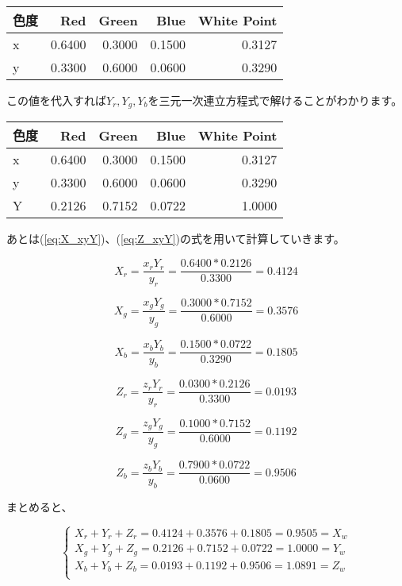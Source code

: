 \documentclass[12pt]{jsarticle}
\begin{document}
\begin{center}
\begin{tabular}{|l|r|r|r|r|} \hline
色度 & Red & Green & Blue & White Point \\ \hline
x & 0.6400 & 0.3000 & 0.1500 & 0.3127 \\ \hline
y & 0.3300 & 0.6000 & 0.0600 & 0.3290 \\ \hline
\end{tabular}
\end{center}

この値を代入すれば$Y_r, Y_g, Y_b$を三元一次連立方程式で解けることがわかります。

\begin{center}
\begin{tabular}{|l|r|r|r|r|} \hline
色度 & Red & Green & Blue & White Point \\ \hline
x & 0.6400 & 0.3000 & 0.1500 & 0.3127 \\ \hline
y & 0.3300 & 0.6000 & 0.0600 & 0.3290 \\ \hline
Y & 0.2126 & 0.7152 & 0.0722 & 1.0000 \\ \hline
\end{tabular}
\end{center}

あとは(\ref{eq:X_xyY})、(\ref{eq:Z_xyY})の式を用いて計算していきます。

\[
X_r = \frac{x_rY_r}{y_r} = \frac{0.6400 * 0.2126}{0.3300} = 0.4124
\]

\[
X_g = \frac{x_gY_g}{y_g} = \frac{0.3000 * 0.7152}{0.6000} = 0.3576
\]

\[
X_b = \frac{x_bY_b}{y_b} = \frac{0.1500 * 0.0722}{0.3290} = 0.1805
\]

\[
Z_r = \frac{z_r Y_r}{y_r} = \frac{0.0300 * 0.2126}{0.3300} = 0.0193
\]

\[
Z_g = \frac{z_g Y_g}{y_g} = \frac{0.1000 * 0.7152}{0.6000} = 0.1192
\]

\[
Z_b = \frac{z_b Y_b}{y_b} = \frac{0.7900 * 0.0722}{0.0600} = 0.9506
\]

まとめると、

\[
\begin{cases}
X_r + Y_r + Z_r = 0.4124 + 0.3576 + 0.1805 = 0.9505 = X_w \\

X_g + Y_g + Z_g = 0.2126 + 0.7152 + 0.0722 = 1.0000 = Y_w \\

X_b + Y_b + Z_b = 0.0193 + 0.1192 + 0.9506 = 1.0891 = Z_w \\
\end{cases}
\]
\end{document}
